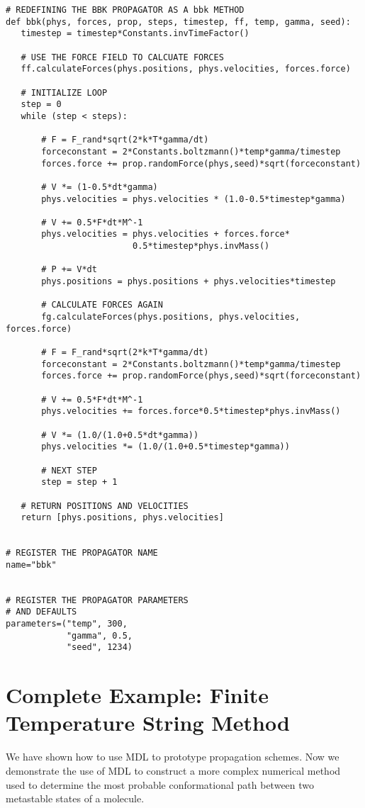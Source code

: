\documentclass[11pt]{report}
\begin{document}
\begin{verbatim}
# REDEFINING THE BBK PROPAGATOR AS A bbk METHOD
def bbk(phys, forces, prop, steps, timestep, ff, temp, gamma, seed):
   timestep = timestep*Constants.invTimeFactor()
   
   # USE THE FORCE FIELD TO CALCUATE FORCES
   ff.calculateForces(phys.positions, phys.velocities, forces.force)

   # INITIALIZE LOOP
   step = 0
   while (step < steps):

       # F = F_rand*sqrt(2*k*T*gamma/dt)
       forceconstant = 2*Constants.boltzmann()*temp*gamma/timestep
       forces.force += prop.randomForce(phys,seed)*sqrt(forceconstant)

       # V *= (1-0.5*dt*gamma)
       phys.velocities = phys.velocities * (1.0-0.5*timestep*gamma)

       # V += 0.5*F*dt*M^-1
       phys.velocities = phys.velocities + forces.force*
                         0.5*timestep*phys.invMass()

       # P += V*dt
       phys.positions = phys.positions + phys.velocities*timestep

       # CALCULATE FORCES AGAIN
       fg.calculateForces(phys.positions, phys.velocities, forces.force)

       # F = F_rand*sqrt(2*k*T*gamma/dt)
       forceconstant = 2*Constants.boltzmann()*temp*gamma/timestep
       forces.force += prop.randomForce(phys,seed)*sqrt(forceconstant)

       # V += 0.5*F*dt*M^-1
       phys.velocities += forces.force*0.5*timestep*phys.invMass()

       # V *= (1.0/(1.0+0.5*dt*gamma))
       phys.velocities *= (1.0/(1.0+0.5*timestep*gamma))         

       # NEXT STEP
       step = step + 1

   # RETURN POSITIONS AND VELOCITIES
   return [phys.positions, phys.velocities]


# REGISTER THE PROPAGATOR NAME
name="bbk"


# REGISTER THE PROPAGATOR PARAMETERS
# AND DEFAULTS
parameters=("temp", 300,
            "gamma", 0.5,
            "seed", 1234)
\end{verbatim}

\chapter{Complete Example: Finite Temperature String Method}

We have shown how to use MDL to prototype propagation
schemes.  Now we demonstrate the use of MDL to construct
a more complex numerical method used to determine the 
most probable conformational path between two metastable
states of a molecule.
\end{document}
